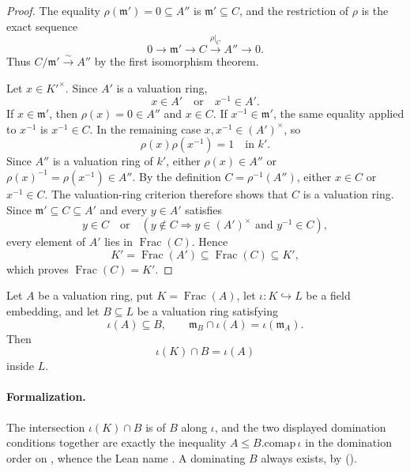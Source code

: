 \begin{proof}
  The equality $\rho(\mathfrak m')=0\subseteq A''$ is
  $\mathfrak m'\subseteq C$, and the restriction of $\rho$ is the exact
  sequence
  \[
    0\longrightarrow\mathfrak m'\longrightarrow C
      \xrightarrow{\rho|_C}A''\longrightarrow0.
  \]
  Thus $C/\mathfrak m'\xrightarrow{\sim}A''$ by the first isomorphism theorem.

  Let $x\in K'^\times$.  Since $A'$ is a valuation ring,
  \[
    x\in A'\quad\text{or}\quad x^{-1}\in A'.
  \]
  If $x\in\mathfrak m'$, then $\rho(x)=0\in A''$ and $x\in C$.  If
  $x^{-1}\in\mathfrak m'$, the same equality applied to $x^{-1}$ is
  $x^{-1}\in C$.  In the remaining case $x,x^{-1}\in(A')^\times$, so
  \[
    \rho(x)\rho(x^{-1})=1\quad\text{in }k'.
  \]
  Since $A''$ is a valuation ring of $k'$, either
  $\rho(x)\in A''$ or $\rho(x)^{-1}=\rho(x^{-1})\in A''$.  By the definition
  $C=\rho^{-1}(A'')$, either $x\in C$ or $x^{-1}\in C$.  The valuation-ring
  criterion therefore shows that $C$ is a valuation ring.  Since
  $\mathfrak m'\subseteq C\subseteq A'$ and every $y\in A'$ satisfies
  \[
    y\in C\quad\text{or}\quad
    (y\notin C\Rightarrow y\in(A')^\times\text{ and }y^{-1}\in C),
  \]
  every element of $A'$ lies in $\operatorname{Frac}(C)$.  Hence
  \[
    K'=\operatorname{Frac}(A')
       \subseteq\operatorname{Frac}(C)
       \subseteq K',
  \]
  which proves $\operatorname{Frac}(C)=K'$.
\end{proof}

\begin{lemma}
  \label{lemma:nagata-valuation-intersection}
  \leanok

  Let $A$ be a valuation ring, put $K=\operatorname{Frac}(A)$, let
  $\iota\colon K\hookrightarrow L$ be a field embedding, and let
  $B\subseteq L$ be a valuation ring satisfying
  \[
    \iota(A)\subseteq B,
    \qquad
    \mathfrak m_B\cap\iota(A)=\iota(\mathfrak m_A).
  \]
  Then
  \[
    \iota(K)\cap B=\iota(A)
  \]
  inside \(L\).

  \paragraph{Formalization.}
  The intersection $\iota(K)\cap B$ is \texttt{} of $B$
  along $\iota$, and the two displayed domination conditions together are exactly the
  inequality $A\le B.\mathrm{comap}\,\iota$ in the domination order on
  \texttt{}, whence the Lean name
  \texttt{}.  A dominating $B$
  always exists, by \texttt{}
  (\cite[\href{https://stacks.math.columbia.edu/tag/00IA}{Tag 00IA}]{stacks-project}).
\end{lemma}

